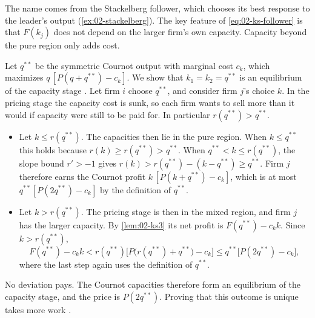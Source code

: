 The name comes from the Stackelberg follower, which chooses its best response to the leader's output
(\cref{ex:02-stackelberg}). The key feature of \eqref{eq:02-ks-follower} is that $F(k_j)$ does not depend on the
larger firm's own capacity. Capacity beyond the pure region only adds cost.

 Let $q^{**}$ be the symmetric Cournot output with marginal cost $c_k$, which maximizes
$q\,[P(q + q^{**}) - c_k]$. We show that $k_1 = k_2 = q^{**}$ is an equilibrium of the capacity stage
\citep[sec.~5.7.2.2]{Tirole1988}. Let firm $i$ choose $q^{**}$, and consider firm $j$'s choice $k$. In the pricing
stage the capacity cost is sunk, so each firm wants to sell more than it would if capacity were still to be paid
for. In particular $r(q^{**}) > q^{**}$.
\begin{itemize}
  \item Let $k \le r(q^{**})$. The capacities then lie in the pure region. When $k \le q^{**}$ this holds because
  $r(k) \ge r(q^{**}) > q^{**}$. When $q^{**} < k \le r(q^{**})$, the slope bound $r' > -1$ gives
  $r(k) > r(q^{**}) - (k - q^{**}) \ge q^{**}$. Firm $j$ therefore earns the Cournot profit $k\,[P(k + q^{**}) -
  c_k]$, which is at most $q^{**}[P(2q^{**}) - c_k]$ by the definition of $q^{**}$.
  \item Let $k > r(q^{**})$. The pricing stage is then in the mixed region, and firm $j$ has the larger capacity. By
  \cref{lem:02-ks3} its net profit is $F(q^{**}) - c_k k$. Since $k > r(q^{**})$,
  \[
    F(q^{**}) - c_k k < r(q^{**})\bigl[P\bigl(r(q^{**}) + q^{**}\bigr) - c_k\bigr] \le q^{**}\bigl[P(2q^{**}) -
    c_k\bigr] ,
  \]
  where the last step again uses the definition of $q^{**}$.
\end{itemize}
No deviation pays. The Cournot capacities therefore form an equilibrium of the capacity stage, and the price is
$P(2q^{**})$. Proving that this outcome is unique takes more work \citep{KrepsScheinkman1983}.

